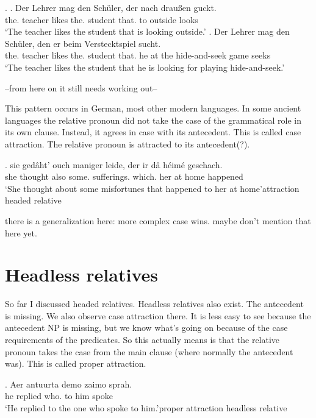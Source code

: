 \ex.\label{ex:germanrelatives}
\ag. Der Lehrer mag den Schüler, der nach draußen guckt.\\
 the. teacher likes the. student that. to outside looks\\
 `The teacher likes the student that is looking outside.'\label{ex:germanrelative1}
 \bg. Der Lehrer mag den Schüler, den er beim Verstecktspiel sucht.\\
 the. teacher likes the. student that. he {at the} {hide-and-seek game} seeks\\
 `The teacher likes the student that he is looking for playing hide-and-seek.'\label{ex:germanrelative2}

--from here on it still needs working out--

This pattern occurs in German, most other modern languages. In some ancient languages the relative pronoun did not take the case of the grammatical role in its own clause. Instead, it agrees in case with its antecedent. This is called case attraction. The relative pronoun is attracted to its antecedent(?).

\exg. sie gedâht' ouch maniger leide, der ir dâ héimé geschach.\\
she thought also some. sufferings. which. her at home happened\\
`She thought about some misfortunes that happened to her at home'\hfill attraction headed relative

there is a generalization here: more complex case wins. maybe don't mention that here yet.


\section{Headless relatives}

So far I discussed headed relatives. Headless relatives also exist. The antecedent is missing. We also observe case attraction there. It is less easy to see because the antecedent NP is missing, but we know what's going on because of the case requirements of the predicates. So this actually means is that the relative pronoun takes the case from the main clause (where normally the antecedent was). This is called proper attraction.

\exg. Aer antuurta demo zaimo sprah.\\
he replied who. {to him} spoke\\
`He replied to the one who spoke to him.'\hfill proper attraction headless relative

